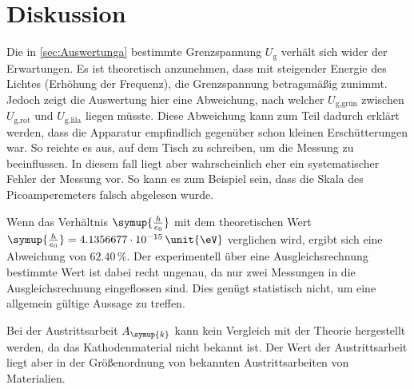 \section{Diskussion}
\label{sec:Diskussion}

Die in \autoref{sec:Auswertunga} bestimmte Grenzspannung $U_{\text{g}}$ verhält sich wider der Erwartungen. Es ist theoretisch anzunehmen, dass mit steigender Energie des Lichtes (Erhöhung der Frequenz), die Grenzspannung betragsmäßig 
zunimmt. Jedoch zeigt die Auswertung hier eine Abweichung, nach welcher $U_{\text{g,grün}}$ zwischen $U_{\text{g,rot}}$ und $U_{\text{g,lila}}$ liegen müsste. 
Diese Abweichung kann zum Teil dadurch erklärt werden, dass die Apparatur empfindlich gegenüber schon kleinen Erschütterungen war. So reichte es aus, auf dem Tisch zu schreiben, um die Messung zu beeinflussen.
In diesem fall liegt aber wahrscheinlich eher ein systematischer Fehler der Messung vor. So kann es zum Beispiel sein, dass die Skala des Picoamperemeters 
falsch abgelesen wurde.

Wenn das Verhältnis $\symup{\frac{h}{e_0}}$ mit dem theoretischen Wert $\symup{\frac{h}{e_0}} = 4.1356677 \cdot 10^{-15} \,\unit{\eV}$ verglichen wird, 
ergibt sich eine Abweichung von $62.40\,\%$. Der experimentell über eine Ausgleichsrechnung bestimmte Wert ist dabei recht ungenau, da nur zwei Messungen 
in die Ausgleichsrechnung eingeflossen sind. Dies genügt statistisch nicht, um eine allgemein gültige Aussage zu treffen. 

Bei der Austrittsarbeit $A_{\symup{k}}$ kann kein Vergleich mit der Theorie hergestellt werden, da das Kathodenmaterial nicht bekannt ist. Der Wert der 
Austrittsarbeit liegt aber in der Größenordnung von bekannten Austrittsarbeiten von Materialien. 

